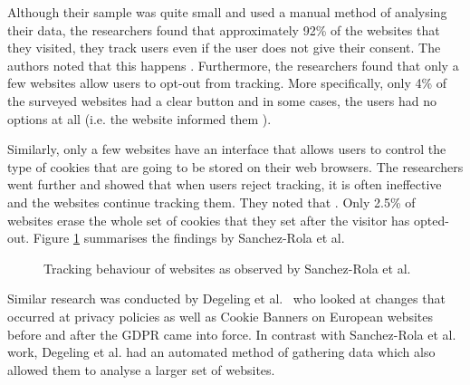 \documentclass[../main.tex]{subfiles}
\begin{document}
Although their sample was quite small and used a manual method of analysing their data, the researchers found that approximately 92\% of the websites that they visited, they track users even if the user does not give their consent. The authors noted that this happens . Furthermore, the researchers found that only a few websites allow users to opt-out from tracking. More specifically, only 4\% of the surveyed websites had a clear  button and in some cases, the users had no options at all (i.e. the website informed them ). 

Similarly, only a few websites have an  interface that allows users to control the type of cookies that are going to be stored on their web browsers. The researchers went further and showed that when users reject tracking, it is often ineffective and the websites continue tracking them. They noted that . Only 2.5\% of websites erase the whole set of cookies that they set after the visitor has opted-out. Figure \ref{fig:sanches} summarises the findings by Sanchez-Rola et al. 

\begin{figure}[ht]
    \centering
    \caption{Tracking behaviour of websites as observed by Sanchez-Rola et al.}
    \label{fig:sanches}
\end{figure}

Similar research was conducted by Degeling et al.~\cite{degeling2018we} who looked at changes that occurred at privacy policies as well as Cookie Banners on European websites before and after the GDPR came into force. In contrast with Sanchez-Rola et al. work, Degeling et al. had an automated method of gathering data which also allowed them to analyse a larger set of websites. 
\end{document}
